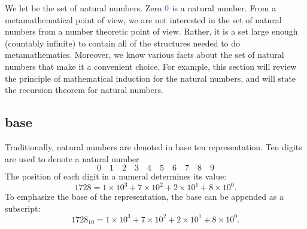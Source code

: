 We let  be the set of natural numbers. 
Zero $\mc{0}$ is a natural number.  From a metamathematical point of view, we are not interested in the set of natural numbers from a number theoretic point of view.  Rather, it is a set large enough (countably infinite) to contain all of the structures needed to do metamathematics.  Moreover, we know various facts about the set of natural numbers that make it a convenient choice. For example, this section will review the principle of mathematical induction for the natural numbers, and will state the recursion theorem for natural numbers.


\subsection{base}

Traditionally, natural numbers are denoted in base ten representation.  Ten digits are used to denote a natural number
$$
0\quad 1\quad 2\quad 3\quad 4\quad 5\quad 6\quad 7\quad 8\quad 9
$$
The position of each digit in a numeral determines its value:
$$
1728 = 1\times 10^3 + 7\times 10^2 + 2\times 10^1 + 8\times 10^0.
$$
To emphasize the base of the representation, the base can be appended as a subscript:
$$1728_{10}=1\times 10^3 + 7\times 10^2 + 2\times 10^1 + 8\times 10^0.$$

